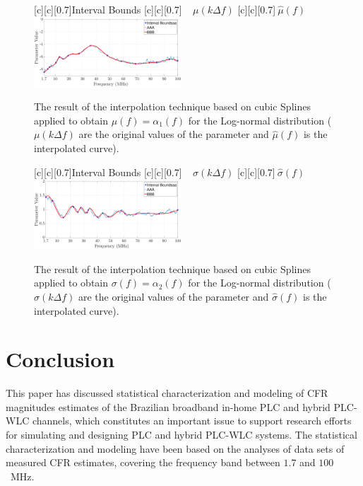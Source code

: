 \documentclass[journal]{IEEEtran}
\begin{document}
\begin{figure}[h]
	\centering
	[c][0.7]{Interval Bounds}
	[c][0.7]{$~~~~~\mu(k \Delta f)$}
	[c][0.7]{$~\hat{\mu}(f)$}
	\includegraphics[width=0.49\textwidth]{images/Alfa_fitlW.eps}
	\caption{The result of the interpolation technique based on cubic Splines applied to obtain $\mu(f)=\alpha_1(f)$ for the Log-normal distribution (${\mu}(k \Delta f)$ are the original values of the parameter and $\hat{\mu}(f)$ is the interpolated curve).}
	\label{Fit_alfalW}
\end{figure}

\begin{figure}[h]
	\centering
	[c][0.7]{Interval Bounds}
	[c][0.7]{$~~~~~{\sigma}(k \Delta f)$}
	[c][0.7]{$~\hat{\sigma}(f)$}
	\includegraphics[width=0.49\textwidth]{images/Beta_fitlW.eps}
	\caption{The result of the interpolation technique based on cubic Splines applied to obtain $\sigma(f)=\alpha_2(f)$ for the Log-normal distribution (${\sigma}(k \Delta f)$ are the original values of the parameter and $\hat{\sigma}(f)$ is the interpolated curve).}
	\label{Fit_betalW}
\end{figure}

\section{Conclusion}
This paper has discussed statistical characterization and modeling of \ac{CFR} magnitudes estimates of the Brazilian broadband in-home \ac{PLC} and hybrid \ac{PLC}-\ac{WLC} channels, which constitutes an important issue to support research efforts for simulating and designing \ac{PLC} and hybrid \ac{PLC}-\ac{WLC} systems. The statistical characterization and modeling have been based on the analyses of data sets of measured \ac{CFR} estimates, covering the frequency band between $1.7$ and $100$~MHz. 
\end{document}
